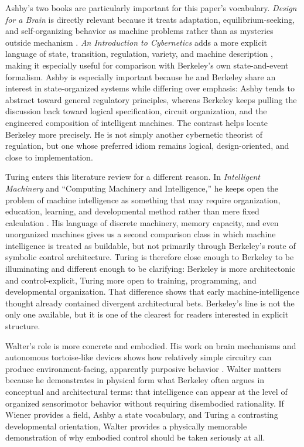 \documentclass[11pt]{article}
\begin{document}
Ashby's two books are particularly important for this paper's vocabulary. \emph{Design for a Brain} is directly relevant because it treats adaptation, equilibrium-seeking, and self-organizing behavior as machine problems rather than as mysteries outside mechanism \citep{ashby1952design}. \emph{An Introduction to Cybernetics} adds a more explicit language of state, transition, regulation, variety, and machine description \citep{ashby1956introduction}, making it especially useful for comparison with Berkeley's own state-and-event formalism. Ashby is especially important because he and Berkeley share an interest in state-organized systems while differing over emphasis: Ashby tends to abstract toward general regulatory principles, whereas Berkeley keeps pulling the discussion back toward logical specification, circuit organization, and the engineered composition of intelligent machines. The contrast helps locate Berkeley more precisely. He is not simply another cybernetic theorist of regulation, but one whose preferred idiom remains logical, design-oriented, and close to implementation.

Turing enters this literature review for a different reason. In \emph{Intelligent Machinery} and ``Computing Machinery and Intelligence,'' he keeps open the problem of machine intelligence as something that may require organization, education, learning, and developmental method rather than mere fixed calculation \citep{turing1948intelligent,turing1950computing}. His language of discrete machinery, memory capacity, and even unorganized machines gives us a second comparison class in which machine intelligence is treated as buildable, but not primarily through Berkeley's route of symbolic control architecture. Turing is therefore close enough to Berkeley to be illuminating and different enough to be clarifying: Berkeley is more architectonic and control-explicit, Turing more open to training, programming, and developmental organization. That difference shows that early machine-intelligence thought already contained divergent architectural bets. Berkeley's line is not the only one available, but it is one of the clearest for readers interested in explicit structure.

Walter's role is more concrete and embodied. His work on brain mechanisms and autonomous tortoise-like devices shows how relatively simple circuitry can produce environment-facing, apparently purposive behavior \citep{walter1953living}. Walter matters because he demonstrates in physical form what Berkeley often argues in conceptual and architectural terms: that intelligence can appear at the level of organized sensorimotor behavior without requiring disembodied rationality. If Wiener provides a field, Ashby a state vocabulary, and Turing a contrasting developmental orientation, Walter provides a physically memorable demonstration of why embodied control should be taken seriously at all.
\end{document}
